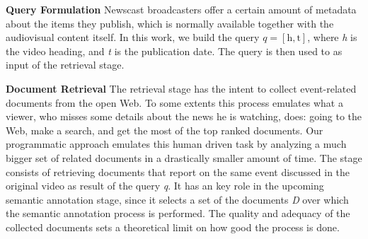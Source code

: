 \documentclass{llncs}
\begin{document}
{\bf Query Formulation} %
Newscast broadcasters offer a certain amount of metadata about the items they publish, which is normally available together with the audiovisual content itself. In this work, we build the query $q= \left [ \text{h}, \text{t} \right ]$, where \textit{h} is the video heading, and \textit{t} is the publication date. The query is then used to as input of the retrieval stage.

{\bf Document Retrieval}
The retrieval stage has the intent to collect event-related documents from the open Web. To some extents this process emulates what a viewer, who misses some details about the news he is watching, does: going to the Web, make a search, and get the most of the top ranked documents. Our programmatic approach emulates this human driven task by analyzing a much bigger set of related documents in a drastically smaller amount of time. The stage consists of retrieving documents that report on the same event discussed in the original video as result of the query \textit{q}. It has an key role in the upcoming semantic annotation stage, since it selects a set of the documents \textit{D} over which the semantic annotation process is performed. The quality and adequacy of the collected documents sets a theoretical limit on how good the process is done. 
\end{document}
